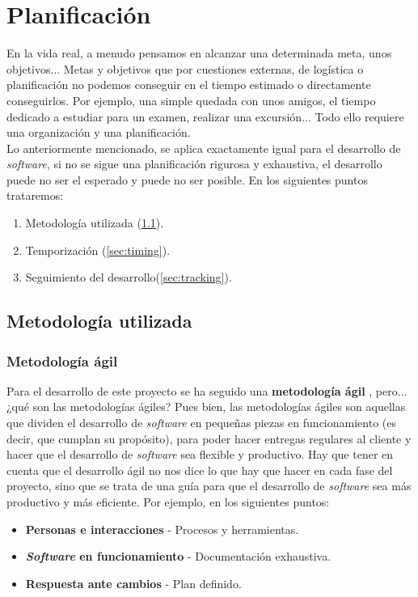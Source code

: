 \chapter{Planificación}
En la vida real, a menudo pensamos en alcanzar una determinada meta, unos objetivos...
Metas y objetivos que por cuestiones externas, de logística o planificación no podemos
conseguir en el tiempo estimado o directamente conseguirlos. Por ejemplo, una simple
quedada con unos amigos, el tiempo dedicado a estudiar para un examen, realizar una
excursión... Todo ello requiere una organización y una planificación.\\

Lo anteriormente mencionado, se aplica exactamente igual para el desarrollo de
\textit{software}, si no se sigue una planificación rigurosa y exhaustiva, el desarrollo
puede no ser el esperado y puede no ser posible. En los siguientes puntos trataremos:

    \begin{enumerate}
        \item Metodología utilizada (\ref{sec:methodology}).
        \item Temporización (\ref{sec:timing}).
        \item Seguimiento del desarrollo(\ref{sec:tracking}).
    \end{enumerate}

\section{Metodología utilizada} \label{sec:methodology}
\subsection{Metodología ágil}
Para el desarrollo de este proyecto se ha seguido una \textbf{metodología ágil}
\cite{agile-methodology}, pero...¿qué son las metodologías ágiles? Pues bien, las
metodologías ágiles son aquellas que dividen el desarrollo de \textit{software} en pequeñas
piezas en funcionamiento (es decir, que cumplan su propósito), para poder hacer entregas
regulares al cliente y hacer que el desarrollo de \textit{software} sea flexible y productivo. Hay que tener
en cuenta que el desarrollo ágil no nos dice lo que hay que hacer en cada fase del
proyecto, sino que se trata de una guía para que el desarrollo de \textit{software} sea más
productivo y más eficiente. Por ejemplo, en los siguientes puntos:

    \begin{itemize}
        \item \textbf{Personas e interacciones} - Procesos y herramientas.
        \item \textbf{\textit{Software} en funcionamiento} - Documentación exhaustiva.
        \item \textbf{Respuesta ante cambios} - Plan definido.
    \end{itemize}

